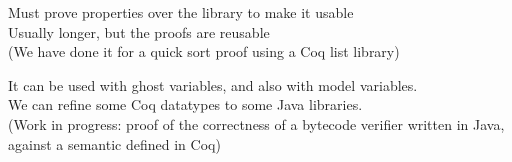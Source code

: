 \blist \small
\item Must prove properties over the library to make it usable\\
\rarrow Usually longer, but the proofs are {\purple reusable}\\
(We have done it for a {\purple quick sort} proof using a Coq list library)
\item It can be used with ghost variables, and 
also with model variables.\\
\rarrow We can refine some Coq datatypes to
some Java libraries.\\
(Work in progress: proof of the correctness of a {\purple bytecode verifier} written in Java, against a semantic defined in Coq)
\elist

